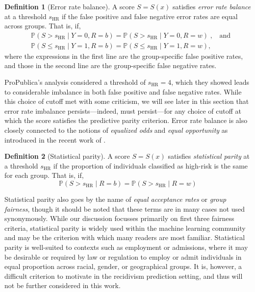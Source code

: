 \documentclass[11pt, svgnames]{article}
\renewcommand{\P}{\mathbb{P}}
\numberwithin{equation}{section}
\theoremstyle{plain}
\theoremstyle{definition}
\newtheorem{definition}{Definition}
\numberwithin{prop}{section}
\numberwithin{corollary}{section}
\begin{document}
 \begin{definition}[Error rate balance]
   A score $S = S(x)$ satisfies \emph{error rate balance} at a threshold $s_\mathrm{HR}$ if the false positive and false negative error rates are equal across groups. That is, if,
   \begin{align}
   &\P(S > s_\mathrm{HR} \mid  Y = 0,  R = b) = \P(S > s_\mathrm{HR} \mid  Y = 0,  R = w)  \;, \;\;  \text{ and} \label{eq:def_fpr}\\ 
   & \P(S \le s_\mathrm{HR} \mid  Y = 1,  R = b) = \P(S \le s_\mathrm{HR} \mid  Y = 1,  R = w), \label{eq:def_fnr}
   \end{align}
   where the expressions in the first line are the group-specific false positive rates, and those in the second line are the group-specific false negative rates.  
 \end{definition} 
 
 ProPublica's analysis considered a threshold of $s_\mathrm{HR} = 4$, which they showed leads to considerable imbalance in both false positive and false negative rates.  While this choice of cutoff met with some criticism, we will see later in this section that error rate imbalance persists---indeed, must persist---for any choice of cutoff at which the score satisfies the predictive parity criterion.  Error rate balance is also closely connected to the notions of \emph{equalized odds} and \emph{equal opportunity} as introduced in the recent work of \citet{hardt2016equality}.
 
 \begin{definition}[Statistical parity]
   A score $S = S(x)$ satisfies \emph{statistical parity} at a threshold $s_\mathrm{HR}$ if the proportion of individuals classified as high-risk is the same for each group. That is, if,
   \begin{equation}
   \P(S > s_\mathrm{HR} \mid  R = b) = \P(S > s_\mathrm{HR} \mid  R = w)
   \label{eq:def_stat_parity}
   \end{equation} 
 \end{definition}
 
 Statistical parity also goes by the name of \emph{equal acceptance rates}\cite{zliobaite2015relation} or \emph{group fairness}\cite{dwork2012fairness}, though it should be noted that these terms are in many cases not used synonymously.  While our discussion focusses primarily on first three fairness criteria, statistical parity is widely used within the machine learning community and may be the criterion with which many readers are most familiar\cite{calders2010three, fish2016confidence}.  Statistical parity is well-suited to contexts such as employment or admissions, where it may be desirable or required by law or regulation to employ or admit individuals in equal proportion across racial, gender, or geographical groups.  It is, however, a difficult criterion to motivate in the recidivism prediction setting, and thus will not be further considered in this work. 
 
\end{document}
